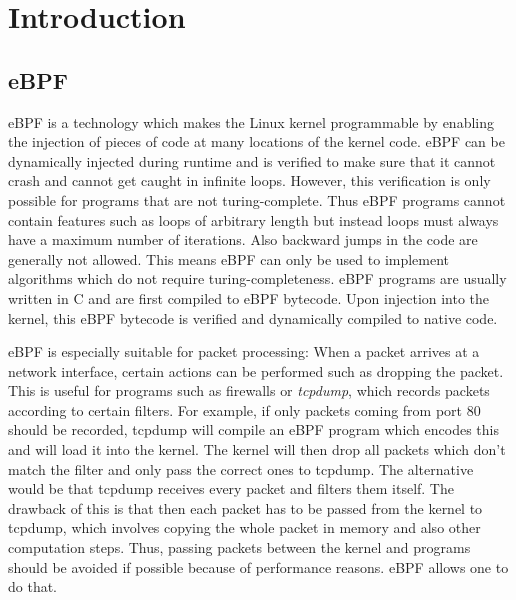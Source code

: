 \documentclass[conference]{IEEEtran}
\begin{document}

\maketitle

\section{Introduction}

\subsection{eBPF}

eBPF is a technology which makes the Linux kernel programmable by enabling the injection of pieces of code at many locations of the kernel code. eBPF can be dynamically injected during runtime and is verified to make sure that it cannot crash and cannot get caught in infinite loops. However, this verification is only possible for programs that are not turing-complete. Thus eBPF programs cannot contain features such as loops of arbitrary length but instead loops must always have a maximum number of iterations. Also backward jumps in the code are generally not allowed. This means eBPF can only be used to implement algorithms which do not require turing-completeness. eBPF programs are usually written in C and are first compiled to eBPF bytecode. Upon injection into the kernel, this eBPF bytecode is verified and dynamically compiled to native code. 

eBPF is especially suitable for packet processing: When a packet arrives at a network interface, certain actions can be performed such as dropping the packet. This is useful for programs such as firewalls \cite{risso_towards_2018} or \textit{tcpdump}, which records packets according to certain filters. For example, if only packets coming from port 80 should be recorded, tcpdump will compile an eBPF program which encodes this and will load it into the kernel. The kernel will then drop all packets which don't match the filter and only pass the correct ones to tcpdump. The alternative would be that tcpdump receives every packet and filters them itself. The drawback of this is that then each packet has to be passed from the kernel to tcpdump, which involves copying the whole packet in memory and also other computation steps. Thus, passing packets between the kernel and programs should be avoided if possible because of performance reasons. eBPF allows one to do that. 
\end{document}
